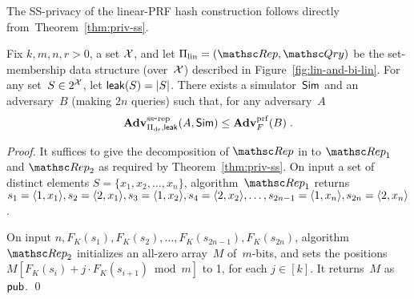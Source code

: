 The SS-privacy of the linear-PRF hash construction follows directly from~Theorem~\ref{thm:priv-ss}.
\begin{theorem}\label{thm:lin-privacy}
Fix $k,m,n,r>0$, a set ${\cal X}$, and let $\setprim_{\mathrm{lin}}=
(\Rep, \Qry)$ be the set-membership data structure (over~${\cal X}$)
described in Figure~\ref{fig:lin-and-bi-lin}. For any set~$S \in
2^{{\cal X}}$, let ${\sf leak}(S)=|S|$.  There exists a simulator~${\sf Sim}$ and
an adversary~$B$ (making $2n$ queries) such that, for any adversary~$A$
\[
\mathrm{\mathbf{Adv}}^{\mathrm{ss\mbox{-}rep}}_{\Pi_{\mathrm{ds}},{\sf leak}}(A,{\sf Sim}) \leq  \mathbf{Adv}^{\mathrm{prf}}_{F}(B)\;.
\]
\end{theorem}
\begin{proof}
It suffices to give the decomposition of $\Rep$ in to $\Rep_1$ and $\Rep_2$ as required by Theorem~\ref{thm:priv-ss}.
On input a set of distinct elements
$S=\{x_1,x_2,\ldots,x_n\}$, algorithm~$\Rep_1$ returns $s_1=\langle 1,x_1 \rangle, s_2=\langle 2,x_1 \rangle, s_3 = \langle 1,x_2\rangle, s_4=\langle 2,x_2 \rangle,\ldots,\linebreak s_{2n-1}=\langle 1,x_n \rangle, s_{2n}=\langle 2,x_n \rangle$.

On input $n,F_K(s_1),F_K(s_2),\ldots,F_K(s_{2n-1}) , F_K(s_{2n})$, algorithm $\Rep_2$ initializes an all-zero array~$M$ of~$m$-bits, and sets the positions $M[F_K(s_i)+j\cdot F_K(s_{i+1})\bmod m]$ to 1, for each $j \in [k]$.  It returns~$M$ as ${\sf pub}$. \hfill\qed
\end{proof}


